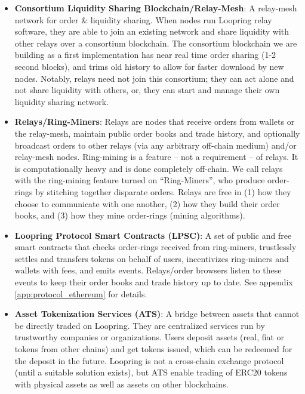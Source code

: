 \documentclass[UTF8,nofonts]{article}
\begin{document}
\begin{multicols}{2}
\begin{itemize}
\item \textbf{Consortium Liquidity Sharing Blockchain/Relay-Mesh}: A relay-mesh network for order \& liquidity sharing. When nodes run Loopring relay software, they are able to join an existing network and share liquidity with other relays over a consortium blockchain. The consortium blockchain we are building as a first implementation has near real time order sharing (1-2 second blocks), and trims old history to allow for faster download by new nodes. Notably, relays need not join this consortium; they can act alone and not share liquidity with others, or, they can start and manage their own liquidity sharing network.

\item \textbf{Relays/Ring-Miners}: Relays are nodes that receive orders from wallets or the relay-mesh, maintain public order books and trade history, and optionally broadcast orders to other relays (via any arbitrary off-chain medium) and/or relay-mesh nodes. Ring-mining is a feature -- not a requirement -- of relays. It is computationally heavy and is done completely off-chain. We call relays with the ring-mining feature turned on \enquote{Ring-Miners}, who produce order-rings by stitching together disparate orders. Relays are free in (1) how they choose to communicate with one another, (2) how they build their order books, and (3) how they mine order-rings (mining algorithms).

\item \textbf{Loopring Protocol Smart Contracts (LPSC)}: A set of public and free smart contracts that checks order-rings received from ring-miners, trustlessly settles and transfers tokens on behalf of users, incentivizes ring-miners and wallets with fees, and emits events. Relays/order browsers listen to these events to keep their order books and trade history up to date. See appendix \ref{app:protocol_ethereum} for details.

\item \textbf{Asset Tokenization Services (ATS)}: A bridge between assets that cannot be directly traded on Loopring. They are centralized services run by trustworthy companies or organizations. Users deposit assets (real, fiat or tokens from other chains) and get tokens issued, which can be redeemed for the deposit in the future. Loopring is not a cross-chain exchange protocol (until a suitable solution exists), but ATS enable trading of ERC20 tokens \cite{ERC20} with physical assets as well as assets on other blockchains. 


\end{itemize}
\end{multicols}
\end{document}

